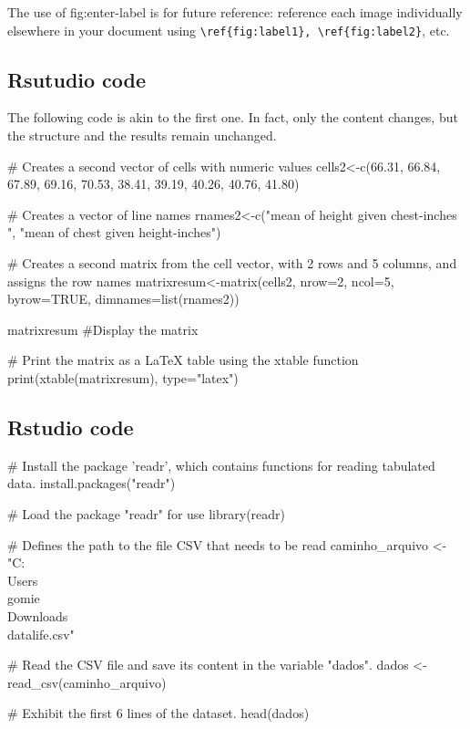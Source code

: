 \documentclass{article}
\begin{document}
The use of fig:enter-label is for future reference: reference each image individually elsewhere in your document using \verb|\ref{fig:label1}, \ref{fig:label2}|, etc.

\subsection{Rsutudio code}
The following code is akin to the first one. In fact, only the content changes, but the structure and the results remain unchanged.
\begin{spverbatim}

# Creates a second vector of cells with numeric values
cells2<-c(66.31, 66.84, 67.89, 69.16, 70.53, 38.41, 39.19, 40.26, 40.76, 41.80)

# Creates a vector of line names
rnames2<-c("mean of height given chest-inches ", "mean of chest given height-inches")

# Creates a second matrix from the cell vector, with 2 rows and 5 columns, and assigns the row names
matrixresum<-matrix(cells2, nrow=2, ncol=5, byrow=TRUE, dimnames=list(rnames2))

matrixresum #Display the matrix

# Print the matrix as a LaTeX table using the xtable function
print(xtable(matrixresum), type="latex")
\end{spverbatim}

\subsection{Rstudio code}
\begin{spverbatim}
# Install the package 'readr', which contains functions for reading tabulated data.
install.packages("readr") 

# Load the package "readr" for use
library(readr)

# Defines the path to the file CSV that needs to be read
caminho_arquivo <- "C:\\Users\\gomie\\Downloads\\datalife.csv"

# Read the CSV file and save its content in the variable "dados".
dados <- read_csv(caminho_arquivo)

# Exhibit the first 6 lines of the dataset.
head(dados)
\end{spverbatim}
\end{document}
